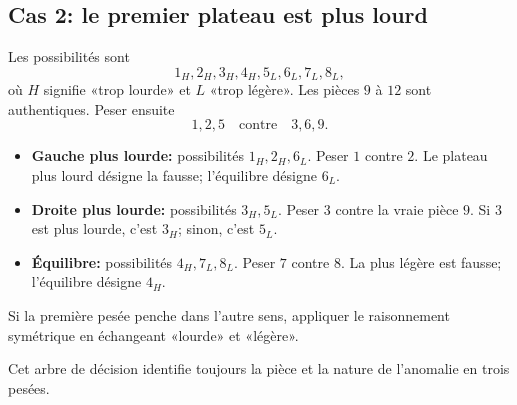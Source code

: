 \documentclass[11pt,a4paper]{article}
\begin{document}
\subsection*{Cas 2: le premier plateau est plus lourd}
Les possibilités sont
\[
1_H,2_H,3_H,4_H,5_L,6_L,7_L,8_L,
\]
où $H$ signifie «trop lourde» et $L$ «trop légère». Les pièces $9$ à $12$ sont
authentiques. Peser ensuite
\[
1,2,5\quad\text{contre}\quad3,6,9.
\]
\begin{itemize}
  \item \textbf{Gauche plus lourde:} possibilités $1_H,2_H,6_L$. Peser $1$
  contre $2$. Le plateau plus lourd désigne la fausse; l'équilibre désigne
  $6_L$.
  \item \textbf{Droite plus lourde:} possibilités $3_H,5_L$. Peser $3$
  contre la vraie pièce $9$. Si $3$ est plus lourde, c'est $3_H$; sinon,
  c'est $5_L$.
  \item \textbf{Équilibre:} possibilités $4_H,7_L,8_L$. Peser $7$ contre
  $8$. La plus légère est fausse; l'équilibre désigne $4_H$.
\end{itemize}

Si la première pesée penche dans l'autre sens, appliquer le raisonnement
symétrique en échangeant «lourde» et «légère».

\begin{resultbox}
Cet arbre de décision identifie toujours la pièce et la nature de l'anomalie
en trois pesées.
\end{resultbox}
\end{document}
